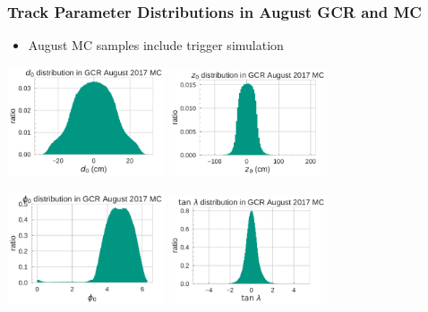 \documentclass[18pt]{beamer}
\begin{document}
\begin{frame}
  \frametitle{Track Parameter Distributions in August GCR and MC}
  \begin{itemize}
  \item August MC samples include trigger simulation
  \end{itemize}
  \begin{center}
    \includegraphics[width=0.35\textwidth]{figures/distributions/gcr_MC_august2017_d0_distribution_uncut.pdf}
    \includegraphics[width=0.35\textwidth]{figures/distributions/gcr_MC_august2017_z0_distribution_uncut.pdf}

    \includegraphics[width=0.35\textwidth]{figures/distributions/gcr_MC_august2017_phi0_distribution_uncut.pdf}
    \includegraphics[width=0.35\textwidth]{figures/distributions/gcr_MC_august2017_tan_lambda_distribution_uncut.pdf}
  \end{center}
\end{frame}
\end{document}

